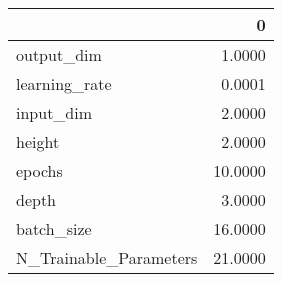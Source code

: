 \begin{tabular}{lr}
\toprule
{} &        0 \\
\midrule
output\_dim             &   1.0000 \\
learning\_rate          &   0.0001 \\
input\_dim              &   2.0000 \\
height                 &   2.0000 \\
epochs                 &  10.0000 \\
depth                  &   3.0000 \\
batch\_size             &  16.0000 \\
N\_Trainable\_Parameters &  21.0000 \\
\bottomrule
\end{tabular}
